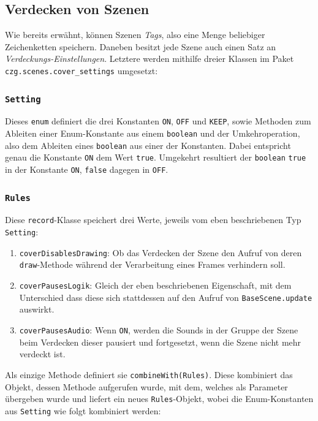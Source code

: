 \begin{sloppypar}
\subsection{Verdecken von Szenen} \label{programm:engine:szene:verdecken}

Wie bereits erwähnt, können Szenen \textit{Tags}, also eine Menge beliebiger
Zeichenketten speichern. Daneben besitzt jede Szene auch einen Satz an
\textit{Verdeckungs-Einstellungen}. Letztere werden mithilfe dreier Klassen
im Paket \texttt{czg.scenes.cover\_settings} umgesetzt:

\subsubsection{\texttt{Setting}}

Dieses \texttt{enum} definiert die drei Konstanten
\texttt{ON}, \texttt{OFF} und \texttt{KEEP}, sowie Methoden zum Ableiten
einer Enum-Konstante aus einem \texttt{boolean} und der Umkehroperation,
also dem Ableiten eines \texttt{boolean} aus einer der Konstanten.
Dabei entspricht genau die Konstante \texttt{ON} dem Wert \texttt{true}.
Umgekehrt resultiert der \texttt{boolean} \texttt{true} in der Konstante
\texttt{ON}, \texttt{false} dagegen in \texttt{OFF}.


\subsubsection{\texttt{Rules}}

Diese \texttt{record}-Klasse speichert drei Werte, jeweils vom
eben beschriebenen Typ \texttt{Setting}:
\begin{enumerate}
	\item \texttt{coverDisablesDrawing}: Ob das Verdecken der Szene den Aufruf
	von deren \texttt{draw}-Methode während der Verarbeitung eines Frames
	verhindern soll.
	\item \texttt{coverPausesLogik}: Gleich der eben beschriebenen Eigenschaft,
	mit dem Unterschied dass diese sich stattdessen auf den Aufruf von
	\texttt{BaseScene.update} auswirkt.
	\item \texttt{coverPausesAudio}: Wenn \texttt{ON}, werden die Sounds in der
	Gruppe der Szene beim Verdecken dieser pausiert und fortgesetzt, wenn
	die Szene nicht mehr verdeckt ist.
\end{enumerate}

Als einzige Methode definiert sie \texttt{combineWith(Rules)}. Diese
kombiniert das Objekt, dessen Methode aufgerufen wurde, mit dem,
welches als Parameter übergeben wurde und liefert ein neues
\texttt{Rules}-Objekt, wobei die Enum-Konstanten aus \texttt{Setting}
wie folgt kombiniert werden:


\end{sloppypar}
